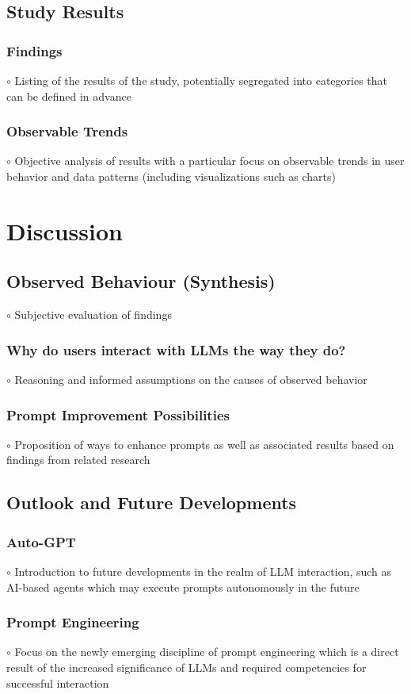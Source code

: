 \documentclass[sigconf]{acmart}
\begin{document}
  \subsection{Study Results}
    \subsubsection{Findings}
$\circ$ Listing of the results of the study, potentially segregated into categories that can be defined in advance
    \subsubsection{Observable Trends}
$\circ$ Objective analysis of results with a particular focus on observable trends in user behavior and data patterns (including visualizations such as charts)

\section{Discussion}
  \subsection{Observed Behaviour (Synthesis)}
$\circ$ Subjective evaluation of findings
    \subsubsection{Why do users interact with LLMs the way they do?}
$\circ$ Reasoning and informed assumptions on the causes of observed behavior
    \subsubsection{Prompt Improvement Possibilities}

$\circ$ Proposition of ways to enhance prompts as well as associated results based on findings from related research
  \subsection{Outlook and Future Developments}
    \subsubsection{Auto-GPT}
$\circ$ Introduction to future developments in the realm of LLM interaction, such as AI-based agents which may execute prompts autonomously in the future
    \subsubsection{Prompt Engineering}
$\circ$ Focus on the newly emerging discipline of prompt engineering which is a direct result of the increased significance of LLMs and required competencies for successful interaction
\end{document}
